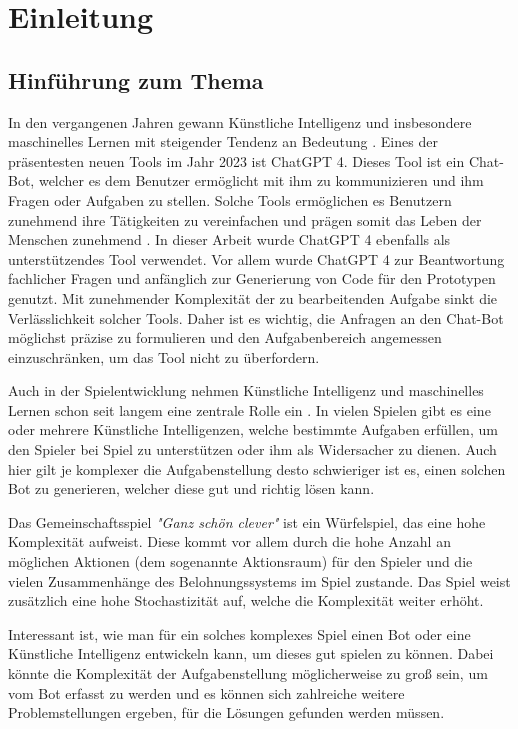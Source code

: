 \section{Einleitung}
\subsection{Hinführung zum Thema}
In den vergangenen Jahren gewann Künstliche Intelligenz und insbesondere maschinelles Lernen mit steigender Tendenz an Bedeutung \cite{noauthor_kunstliche_nodate,noauthor_maschinelles_2023}. Eines der präsentesten neuen Tools im Jahr 2023 ist ChatGPT 4. Dieses Tool ist ein Chat-Bot, welcher es dem Benutzer ermöglicht mit ihm zu kommunizieren und ihm Fragen oder Aufgaben zu stellen. Solche Tools ermöglichen es Benutzern zunehmend ihre Tätigkeiten zu vereinfachen und prägen somit das Leben der Menschen zunehmend \cite{tagesschaude_chatgpt_nodate}. In dieser Arbeit wurde ChatGPT 4 ebenfalls als unterstützendes Tool verwendet. Vor allem wurde ChatGPT 4 zur Beantwortung fachlicher Fragen und anfänglich zur Generierung von Code für den Prototypen genutzt. Mit zunehmender Komplexität der zu bearbeitenden Aufgabe sinkt die Verlässlichkeit solcher Tools. Daher ist es wichtig, die Anfragen an den Chat-Bot möglichst präzise zu formulieren und den Aufgabenbereich angemessen einzuschränken, um das Tool nicht zu überfordern.

Auch in der Spielentwicklung nehmen Künstliche Intelligenz und maschinelles Lernen schon seit langem eine zentrale Rolle ein \cite{noauthor_kunstliche_2023}. In vielen Spielen gibt es eine oder mehrere Künstliche Intelligenzen, welche bestimmte Aufgaben erfüllen, um den Spieler bei Spiel zu unterstützen oder ihm als Widersacher zu dienen. Auch hier gilt je komplexer die Aufgabenstellung desto schwieriger ist es, einen solchen Bot zu generieren, welcher diese gut und richtig lösen kann.

Das Gemeinschaftsspiel \textit{"Ganz schön clever"} ist ein Würfelspiel, das eine hohe Komplexität aufweist. Diese kommt vor allem durch die hohe Anzahl an möglichen Aktionen (dem sogenannte Aktionsraum) für den Spieler und die vielen Zusammenhänge des Belohnungssystems im Spiel zustande. Das Spiel weist zusätzlich eine hohe Stochastizität auf, welche die Komplexität weiter erhöht.

Interessant ist, wie man für ein solches komplexes Spiel einen Bot oder eine Künstliche Intelligenz entwickeln kann, um dieses gut spielen zu können. Dabei könnte die Komplexität der Aufgabenstellung möglicherweise zu groß sein, um vom Bot erfasst zu werden und es können sich zahlreiche weitere Problemstellungen ergeben, für die Lösungen gefunden werden müssen.
